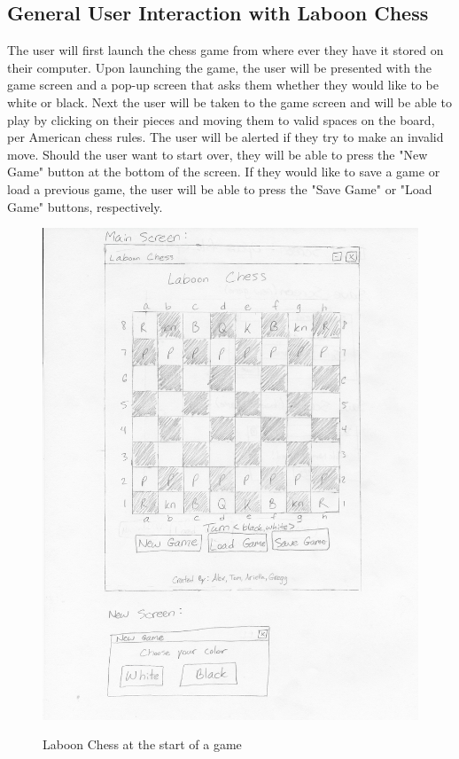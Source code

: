 \documentclass{article}
\begin{document}
	\subsection*{General User Interaction with Laboon Chess}
	The user will first launch the chess game from where ever they have it stored on their computer. Upon launching the game, the user will be presented with the game screen and a pop-up screen that asks them whether they would like to be white or black. Next the user will be taken to the game screen and will be able to play by clicking on their pieces and moving them to valid spaces on the board, per American chess rules. The user will be alerted if they try to make an invalid move. Should the user want to start over, they will be able to press the "New Game" button at the bottom of the screen.  If they would like to save a game or load a previous game, the user will be able to press the "Save Game" or "Load Game" buttons, respectively.
	\begin{figure}[H]
		\caption{Laboon Chess at the start of a game}
		\includegraphics[width=\linewidth]{PaperProtoType.jpg}
		\label{fig:prototype1}
	\end{figure}
\end{document}
